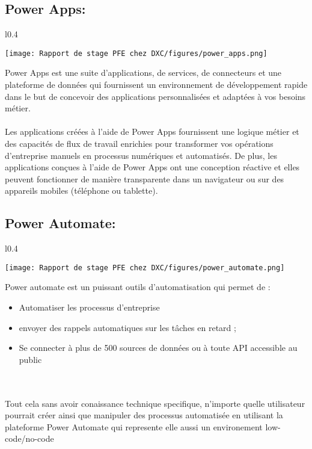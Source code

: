 \subsection{Power Apps: }
\vspace{0.5cm}

\begin{wrapfigure}{l}{0.4\textwidth}
  \begin{center}
    \texttt{[image: Rapport de stage PFE chez DXC/figures/power\_apps.png]}
  \end{center}
\end{wrapfigure}

Power Apps est une suite d’applications, de services, de connecteurs et une plateforme de données qui fournissent un environnement de développement rapide dans le but de concevoir des applications personnalisées et adaptées à vos besoins métier.
\\
\\
Les applications créées à l’aide de Power Apps fournissent une logique métier et des capacités de flux de travail enrichies pour transformer vos opérations d’entreprise manuels en processus numériques et automatisés. De plus, les applications conçues à l’aide de Power Apps ont une conception réactive et elles peuvent fonctionner de manière transparente dans un navigateur ou sur des appareils mobiles (téléphone ou tablette).

\newpage
\subsection{Power Automate: }

\begin{wrapfigure}{l}{0.4\textwidth}
  \begin{center}
    \texttt{[image: Rapport de stage PFE chez DXC/figures/power\_automate.png]}
  \end{center}
\end{wrapfigure}

Power automate est un puissant outils d'automatisation qui permet de :
\begin{itemize}
  \item Automatiser les processus d’entreprise
  \item envoyer des rappels automatiques sur les tâches en retard ;
  \item Se connecter à plus de 500 sources de données ou à toute API accessible au public
\end{itemize}
\\ 
\\
Tout cela sans avoir conaissance technique specifique, n'importe quelle utilisateur pourrait créer ainsi que manipuler des processus automatisée en utilisant la plateforme Power Automate qui represente elle aussi un environement low-code/no-code

